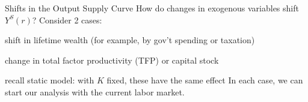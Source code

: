\documentclass[11pt,aspectratio=169,usenames,dvipsnames]{beamer}
\let\tempone\itemize
\let\temptwo\enditemize
\renewenvironment{itemize}{\tempone\addtolength{\itemsep}{\fill}}{\temptwo}
\let\tempa\enumerate
\let\tempb\endenumerate
\renewenvironment{enumerate}{\tempa\addtolength{\itemsep}{\fill}}{\tempb}
\begin{document}
\begin{frame}{Shifts in the Output Supply Curve}
\label{slide:Shifts_in_the_Output_Supply_Curve}
    How do changes in exogenous variables shift $ Y^{S}( r ) $? Consider 2 cases:
    \begin{enumerate}
        \item shift in lifetime wealth (for example, by gov’t spending or taxation)
        \item change in total factor productivity (TFP) or capital stock
        \begin{itemize}
            \item recall static model: with $ K $ fixed, these have the same effect
        \end{itemize}
    \end{enumerate}
    In each case, we can start our analysis with the current labor market.
\end{frame}
\end{document}
